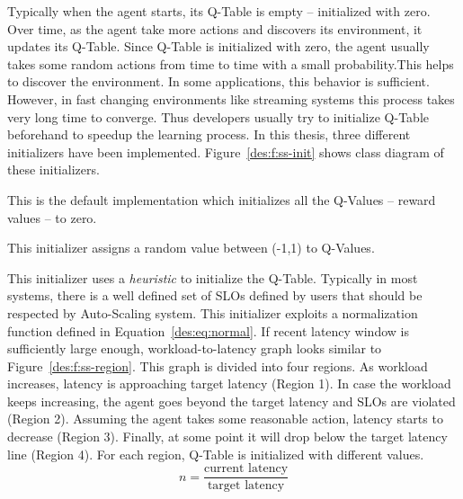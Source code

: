 Typically when the agent starts, its Q-Table is empty -- initialized with zero. Over time, as the agent take more actions and discovers its environment, it updates its Q-Table. Since Q-Table is initialized with zero, the agent usually takes some random actions from time to time with a small probability.This helps to discover the environment. In some applications, this behavior is sufficient. However, in fast changing environments like streaming systems this process takes very long time to converge. Thus developers usually try to initialize Q-Table beforehand to speedup the learning process. In this thesis, three different initializers have been implemented. Figure~\ref{des:f:ss-init} shows class diagram of these initializers.
\begin{description}[leftmargin=0pt]
\item[Zero Initializer] This is the default implementation which initializes all the Q-Values -- reward values -- to zero.
\item[Random Initializer] This initializer assigns a random value between (-1,1) to Q-Values.
\item[Optimized Initializer] This initializer uses a \emph{heuristic} to initialize the Q-Table. Typically in most systems, there is a well defined set of SLOs defined by users that should be respected by Auto-Scaling system. This initializer exploits a normalization function defined in Equation~\ref{des:eq:normal}. If recent latency window is sufficiently large enough, workload-to-latency graph looks similar to Figure~\ref{des:f:ss-region}. This graph is divided into four regions. As workload increases, latency is approaching target latency (Region 1). In case the workload keeps increasing, the agent goes beyond the target latency and SLOs are violated (Region 2). Assuming the agent takes some reasonable action, latency starts to decrease (Region 3). Finally, at some point it will drop below the target latency line (Region 4). For each region, Q-Table is initialized with different values.
\begin{equation}
n = \frac{\text{current latency}}{\text{target latency}}
\label{des:eq:normal}
\end{equation}
\end{description}
